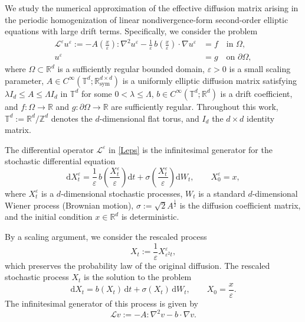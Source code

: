 \documentclass[12pt,a4paper,reqno]{amsart}
\numberwithin{equation}{section}
\begin{document}
We study the numerical approximation of the effective diffusion matrix arising in the periodic homogenization of linear nondivergence-form second-order elliptic equations with large drift terms. Specifically, we consider the problem
\begin{equation}\label{Leps}
\begin{aligned}
    \mathcal{L}^\varepsilon u^{\varepsilon} := -A\left(\frac{x}{\varepsilon}\right):\nabla^2 u^{\varepsilon} - \frac{1}{\varepsilon}\,b\left(\frac{x}{\varepsilon}\right)\cdot \nabla u^\varepsilon &= f\quad \text{in }\Omega,\\
    u^\varepsilon &= g\quad \text{on }\partial \Omega,
    \end{aligned}
\end{equation} 
where $\Omega \subset \mathbb{R}^d$ is a sufficiently regular bounded domain, $\varepsilon > 0$ is a small scaling parameter, $A \in C^{\infty}(\mathbb{T}^d ; \mathbb{R}_{\mathrm{sym}}^{d\times d})$ is a uniformly elliptic diffusion matrix satisfying $\lambda I_d \le A \le \Lambda I_d$ in $\mathbb{T}^d$ for some $0<\lambda\leq \Lambda$, $b \in C^\infty(\mathbb{T}^d ; \mathbb{R}^d)$ is a drift coefficient, and $f:\Omega\rightarrow\mathbb{R}$ and $g:\partial\Omega\rightarrow \mathbb{R}$ are sufficiently regular. Throughout this work, $\mathbb{T}^d := \mathbb{R}^d/\mathbb{Z}^d$ denotes the $d$-dimensional flat torus, and $I_d$ the $d\times d$ identity matrix. 

The differential operator $\mathcal{L}^\varepsilon$ in \eqref{Leps} is the infinitesimal generator for the stochastic differential equation
\begin{equation}\label{diffusion with large drift}
\mathrm{d} X^{\varepsilon}_t=\frac{1}{\varepsilon}\, b\left(\frac{X^{\varepsilon}_t}{\varepsilon}\right) \mathrm{d} t+\sigma\left(\frac{X^{\varepsilon}_t}{\varepsilon}\right)  \mathrm{d} W_t,\qquad X_0^\varepsilon = x,
\end{equation}
where $X^\varepsilon_t$ is a $d$-dimensional stochastic processes, $W_t$ is a standard $d$-dimensional Wiener process (Brownian motion), $\sigma:=\sqrt{2} A^{\frac{1}{2}}$ is the diffusion coefficient matrix, and the initial condition $x\in \mathbb{R}^d$ is deterministic. 
 

By a scaling argument, we consider the rescaled process 
\begin{equation}\label{rescaled process}
X_t := \frac{1}{\varepsilon}X^\varepsilon_{\varepsilon^2 t},
\end{equation}
which preserves the probability law of the original diffusion. The rescaled stochastic process $X_t$ is the solution to the problem
\begin{equation}\label{rescaled SDE}
 \mathrm{d}X_t =  b(X_t) \,\mathrm{d}t +\sigma(X_t)\, \mathrm{d} W_t,\qquad X_0 = \frac{x}{\varepsilon}.
\end{equation} 
The infinitesimal generator of this process is given by
\begin{equation}\label{L}
\mathcal{L}v := -A:\nabla^2 v -b\cdot \nabla v.
\end{equation}
 
\end{document}
